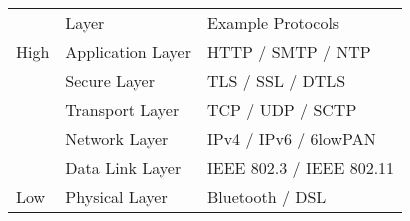 \begin{tabular}{l|l|l|}
\cline{2-3}
                  & Layer             & Example Protocols        \\ \cline{2-3} 
High            & Application Layer & HTTP / SMTP / NTP        \\ \cline{2-3} 
  & Secure Layer      & TLS / SSL / DTLS         \\ \cline{2-3} 
              & Transport Layer   & TCP / UDP / SCTP         \\ \cline{2-3} 
              & Network Layer     & IPv4 / IPv6 / 6lowPAN    \\ \cline{2-3} 
               & Data Link Layer   & IEEE 802.3 / IEEE 802.11 \\ \cline{2-3} 
Low                 & Physical Layer    &  Bluetooth / DSL        \\ \cline{2-3} 
\end{tabular}
